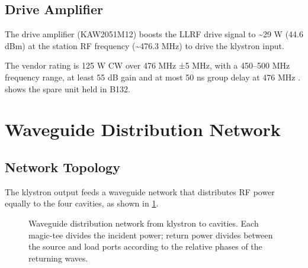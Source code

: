 

\subsection{Drive Amplifier}

The drive amplifier (KAW2051M12) boosts the LLRF drive signal to \textasciitilde29 W (44.6 dBm) at the station RF frequency (\textasciitilde476.3 MHz) to drive the klystron input.

The vendor rating is 125 W CW over 476 MHz ±5 MHz, with a 450--500 MHz frequency range, at least 55 dB gain and at most 50 ns group delay at 476 MHz .  shows the spare unit held in B132.



\section{Waveguide Distribution Network}\label{sec:waveguide}

\subsection{Network Topology}

The klystron output feeds a waveguide network that distributes RF power equally to the four cavities, as shown in \cref{fig:waveguide}.

\begin{figure}[tbp]\centering
\begin{fitpicture}\end{fitpicture}
\caption{Waveguide distribution network from klystron to cavities. Each
  magic-tee divides the incident power; return power divides between the
  source and load ports according to the relative phases of the returning
  waves.}\label{fig:waveguide}
\end{figure}

